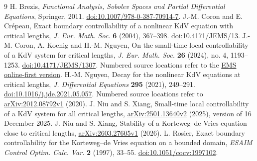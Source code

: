 \documentclass[11pt]{article}
\theoremstyle{remark}\newtheorem{remark}[theorem]{Remark}
\numberwithin{equation}{section}
\begin{document}
\begin{thebibliography}{9}
H. Brezis, \emph{Functional Analysis, Sobolev Spaces and Partial Differential
Equations}, Springer, 2011. \href{https://doi.org/10.1007/978-0-387-70914-7}{doi:10.1007/978-0-387-70914-7}.
J.-M. Coron and E. Cr\'epeau, Exact boundary controllability of a nonlinear
KdV equation with critical lengths, \emph{J. Eur. Math. Soc.} \textbf{6}
(2004), 367--398. \href{https://doi.org/10.4171/JEMS/13}{doi:10.4171/JEMS/13}.
J.-M. Coron, A. Koenig and H.-M. Nguyen, On the small-time local
controllability of a KdV system for critical lengths,
\emph{J. Eur. Math. Soc.} \textbf{26} (2024), no. 4, 1193--1253. \href{https://doi.org/10.4171/JEMS/1307}{doi:10.4171/JEMS/1307}.
Numbered source locations refer to the \href{https://ems.press/content/serial-article-files/31384}{EMS online-first version}.
H.-M. Nguyen, Decay for the nonlinear KdV equations at critical lengths,
\emph{J. Differential Equations} \textbf{295} (2021), 249--291.
\href{https://doi.org/10.1016/j.jde.2021.05.057}{doi:10.1016/j.jde.2021.05.057}.
Numbered source locations refer to
\href{https://arxiv.org/abs/2012.08792v1}{arXiv:2012.08792v1} (2020).
J. Niu and S. Xiang, Small-time local controllability of a KdV system for all
critical lengths, \href{https://arxiv.org/abs/2501.13640v2}{arXiv:2501.13640v2}
(2025), version of 16 December 2025.
J. Niu and S. Xiang, Stability of a Korteweg--de Vries equation close to critical
lengths, \href{https://arxiv.org/abs/2603.27605v1}{arXiv:2603.27605v1} (2026).
L. Rosier, Exact boundary controllability for the Korteweg--de Vries equation
on a bounded domain, \emph{ESAIM Control Optim. Calc. Var.} \textbf{2}
(1997), 33--55. \href{https://doi.org/10.1051/cocv:1997102}{doi:10.1051/cocv:1997102}.
\end{thebibliography}
\end{document}
